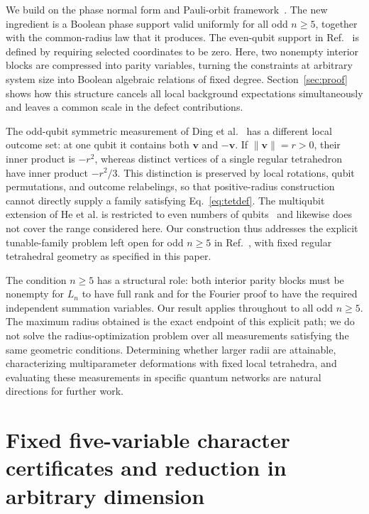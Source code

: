 \documentclass[11pt,a4paper]{article}
\numberwithin{equation}{section}
\theoremstyle{definition}
\begin{document}
We build on the phase normal form and Pauli-orbit framework~\cite{PauwelsPauli2026,PauwelsTunable2026}. The new ingredient is a Boolean phase support valid uniformly for all odd $n\geq5$, together with the common-radius law that it produces. The even-qubit support in Ref.\ \cite{PauwelsTunable2026} is defined by requiring selected coordinates to be zero. Here, two nonempty interior blocks are compressed into parity variables, turning the constraints at arbitrary system size into Boolean algebraic relations of fixed degree. Section~\ref{sec:proof} shows how this structure cancels all local background expectations simultaneously and leaves a common scale in the defect contributions.

The odd-qubit symmetric measurement of Ding et al.~\cite[Sec.~V]{Ding2025} has a different local outcome set: at one qubit it contains both $\bm v$ and $-\bm v$. If $\|\bm v\|=r>0$, their inner product is $-r^2$, whereas distinct vertices of a single regular tetrahedron have inner product $-r^2/3$. This distinction is preserved by local rotations, qubit permutations, and outcome relabelings, so that positive-radius construction cannot directly supply a family satisfying Eq.~\eqref{eq:tetdef}. The multiqubit extension of He et al. is restricted to even numbers of qubits~\cite[Sec.~IV]{He2026} and likewise does not cover the range considered here. Our construction thus addresses the explicit tunable-family problem left open for odd $n\geq5$ in Ref.\ \cite{PauwelsTunable2026}, with fixed regular tetrahedral geometry as specified in this paper.

The condition $n\geq5$ has a structural role: both interior parity blocks must be nonempty for $L_n$ to have full rank and for the Fourier proof to have the required independent summation variables. Our result applies throughout to all odd $n\geq5$. The maximum radius obtained is the exact endpoint of this explicit path; we do not solve the radius-optimization problem over all measurements satisfying the same geometric conditions. Determining whether larger radii are attainable, characterizing multiparameter deformations with fixed local tetrahedra, and evaluating these measurements in specific quantum networks are natural directions for further work.

\appendix
\section{Fixed five-variable character certificates and reduction in arbitrary dimension}
\label{app:certificate}
\end{document}
